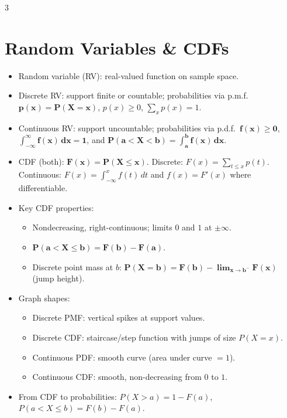 \documentclass[11pt,landscape]{article}
\begin{document}
\scriptsize\bfseries\boldmath

\begin{multicols}{3}

\section{Random Variables \& CDFs}
\begin{itemize}
  \item Random variable (RV): real-valued function on sample space.
  \item Discrete RV: support finite or countable; probabilities via p.m.f.\ $\mathbf{p(x)=P(X=x)}$, $p(x)\ge0$, $\sum_x p(x)=1$.
  \item Continuous RV: support uncountable; probabilities via p.d.f.\ $\mathbf{f(x)\ge0}$, $\mathbf{\int_{-\infty}^{\infty} f(x)\,dx=1}$, and $\mathbf{P(a<X<b)=\int_a^b f(x)\,dx}$.
  \item CDF (both): $\mathbf{F(x)=P(X\le x)}$. Discrete: $F(x)=\sum_{t\le x}p(t)$. Continuous: $F(x)=\int_{-\infty}^x f(t)\,dt$ and $f(x)=F'(x)$ where differentiable.
  \item Key CDF properties:
    \begin{itemize}
      \item Nondecreasing, right-continuous; limits $0$ and $1$ at $\pm\infty$.
      \item $\mathbf{P(a<X\le b)=F(b)-F(a)}$.
      \item Discrete point mass at $b$: $\mathbf{P(X=b)=F(b)-\lim_{x\to b^-}F(x)}$ (jump height).
    \end{itemize}
  \item Graph shapes:
    \begin{itemize}
      \item Discrete PMF: vertical spikes at support values.
      \item Discrete CDF: staircase/step function with jumps of size $P(X=x)$.
      \item Continuous PDF: smooth curve (area under curve $=1$).
      \item Continuous CDF: smooth, non-decreasing from $0$ to $1$.
    \end{itemize}
  \item From CDF to probabilities: $P(X>a)=1-F(a)$, $P(a<X\le b)=F(b)-F(a)$.
\end{itemize}


\end{multicols}
\end{document}
